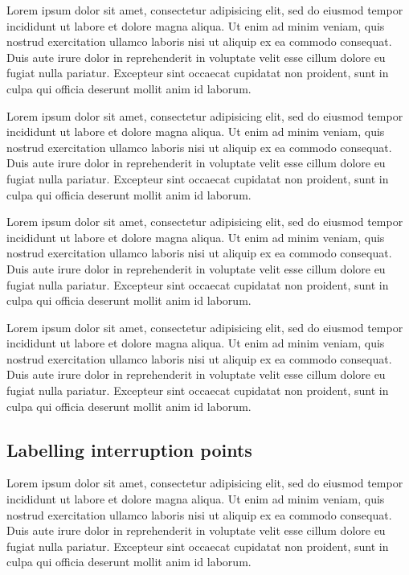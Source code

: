 \documentclass[11pt,letterpaper]{article}
\begin{document}
Lorem ipsum dolor sit amet, consectetur adipisicing elit, sed do eiusmod tempor incididunt ut labore et dolore magna aliqua. Ut enim ad minim veniam, quis nostrud exercitation ullamco laboris nisi ut aliquip ex ea commodo consequat. Duis aute irure dolor in reprehenderit in voluptate velit esse cillum dolore eu fugiat nulla pariatur. Excepteur sint occaecat cupidatat non proident, sunt in culpa qui officia deserunt mollit anim id laborum.

Lorem ipsum dolor sit amet, consectetur adipisicing elit, sed do eiusmod tempor incididunt ut labore et dolore magna aliqua. Ut enim ad minim veniam, quis nostrud exercitation ullamco laboris nisi ut aliquip ex ea commodo consequat. Duis aute irure dolor in reprehenderit in voluptate velit esse cillum dolore eu fugiat nulla pariatur. Excepteur sint occaecat cupidatat non proident, sunt in culpa qui officia deserunt mollit anim id laborum.

Lorem ipsum dolor sit amet, consectetur adipisicing elit, sed do eiusmod tempor incididunt ut labore et dolore magna aliqua. Ut enim ad minim veniam, quis nostrud exercitation ullamco laboris nisi ut aliquip ex ea commodo consequat. Duis aute irure dolor in reprehenderit in voluptate velit esse cillum dolore eu fugiat nulla pariatur. Excepteur sint occaecat cupidatat non proident, sunt in culpa qui officia deserunt mollit anim id laborum.

Lorem ipsum dolor sit amet, consectetur adipisicing elit, sed do eiusmod tempor incididunt ut labore et dolore magna aliqua. Ut enim ad minim veniam, quis nostrud exercitation ullamco laboris nisi ut aliquip ex ea commodo consequat. Duis aute irure dolor in reprehenderit in voluptate velit esse cillum dolore eu fugiat nulla pariatur. Excepteur sint occaecat cupidatat non proident, sunt in culpa qui officia deserunt mollit anim id laborum.

\subsection{Labelling interruption points}

Lorem ipsum dolor sit amet, consectetur adipisicing elit, sed do eiusmod tempor incididunt ut labore et dolore magna aliqua. Ut enim ad minim veniam, quis nostrud exercitation ullamco laboris nisi ut aliquip ex ea commodo consequat. Duis aute irure dolor in reprehenderit in voluptate velit esse cillum dolore eu fugiat nulla pariatur. Excepteur sint occaecat cupidatat non proident, sunt in culpa qui officia deserunt mollit anim id laborum.
\end{document}
